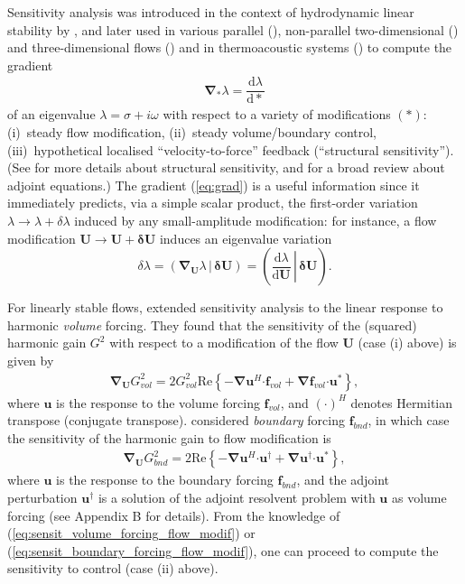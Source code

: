 \documentclass[11pt,onecolumn]{article}
\def\ff {\mathbf{f}}
\def\uu {\mathbf{u}}
\def\UU {\mathbf{U}}
\newcommand{\ps}   [2]{\ensuremath{\left(\left. {#1} \, \right| \, {#2} \right) }}
\providecommand\bdelta{\boldsymbol{\delta}}\providecommand\bnabla{\boldsymbol{\nabla}}
\providecommand\bcdot{\boldsymbol{\cdot}}
\begin{document}
Sensitivity analysis was introduced in the context of hydrodynamic linear stability by \cite{Hill92AIAA}, and later used in various parallel (\cite{Bottaro03}), non-parallel two-dimensional (\cite{Giannetti07, Marquet08cyl, Meliga10}) and three-dimensional flows (\cite{Fani2012}) and in thermoacoustic systems (\cite{Magri13}) to compute the gradient 
\begin{align}
\bnabla_{*} \lambda
=
\dfrac{\mathrm{d}\lambda}{\mathrm{d}*}
\label{eq:grad}
\end{align}
of an eigenvalue 
$\lambda=\sigma+i\omega$ 
with respect to a variety of  modifications $(*)$:
(i)~steady flow modification,
(ii)~steady volume/boundary control,
(iii)~hypothetical localised ``velocity-to-force'' feedback (``structural sensitivity'').
(See  \cite{Chomaz05} for more details about structural sensitivity, and \cite{Luchini14} for a broad review about adjoint equations.)
The gradient (\ref{eq:grad}) is a useful information since it immediately predicts, via a simple scalar product, the first-order variation $\lambda\rightarrow\lambda+\delta\lambda$ induced by any small-amplitude modification: for instance, a flow modification $\UU \rightarrow \UU+\bdelta\UU$ induces an eigenvalue variation
$$
\delta\lambda 
= \ps{\bnabla_{\UU} \lambda}{\bdelta\UU}
= \ps{\dfrac{\mathrm{d}\lambda}{\mathrm{d}\UU}}{\bdelta\UU}.
$$

For linearly stable flows, \cite{Brandt11} extended sensitivity analysis to the linear response to harmonic \textit{volume} forcing.
They found that the sensitivity of the (squared) harmonic gain $G^2$ with respect to a modification of the flow $\UU$ (case (i) above) is given by 
\begin{align}
\bnabla_{\UU} G_{vol}^2%
= 
2 G_{vol}^2 \mbox{Re} \left\{ 
-\bnabla\uu^H     \bcdot \ff_{vol} 
+\bnabla\ff_{vol} \bcdot \uu^*
\right\},
\label{eq:sensit_volume_forcing_flow_modif}
\end{align}
where $\uu$ is the response to the  volume forcing $\ff_{vol}$, and $(\cdot)^H$ denotes Hermitian transpose (conjugate transpose).
%
\cite{Boujo15a} considered \textit{boundary} forcing $\ff_{bnd}$, in which case the sensitivity of the harmonic gain to flow modification is
\begin{align}
\bnabla_{\UU} G_{bnd}^2%
= 
2 \mbox{Re} \left\{ 
-\bnabla\uu^H \bcdot \uu^\dag 
+\bnabla\uu^\dag   \bcdot \uu^*
\right\},
\label{eq:sensit_boundary_forcing_flow_modif}
\end{align}
where $\uu$ is the response to the  boundary forcing $\ff_{bnd}$, and
the adjoint perturbation $\uu^\dag$ is a solution of the adjoint resolvent problem with $\uu$ as volume forcing (see Appendix B for details).
From the knowledge of (\ref{eq:sensit_volume_forcing_flow_modif}) or (\ref{eq:sensit_boundary_forcing_flow_modif}), one can proceed to compute the sensitivity to control (case (ii) above).
\end{document}
